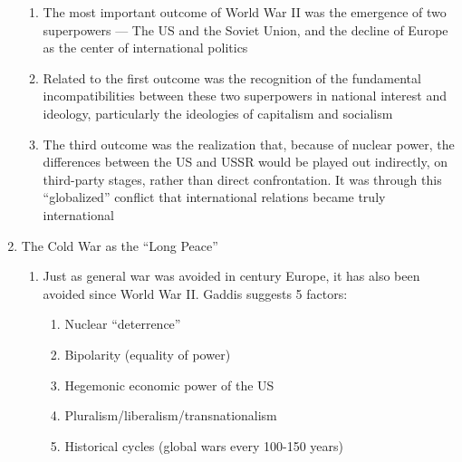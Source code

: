 \documentclass[12pt]{article}
\begin{document}
\begin{enumerate}
        \begin{enumerate}

          \item The most important outcome of World War II was the emergence of two superpowers — The US and the Soviet Union, and the decline of Europe as the center of international politics

          \item Related to the first outcome was the recognition of the fundamental incompatibilities between these two superpowers in national interest and ideology, particularly the ideologies of capitalism and socialism

          \item The third outcome was the realization that, because of nuclear power, the differences between the US and USSR would be played out indirectly, on third-party stages, rather than direct confrontation. It was through this “globalized” conflict that international relations became truly international

        \end{enumerate}

      \item The Cold War as the “Long Peace”

        \begin{enumerate}

          \item Just as general war was avoided in  century Europe, it has also been avoided since World War II. Gaddis suggests 5 factors:

            \begin{enumerate}

              \item Nuclear “deterrence”

              \item Bipolarity (equality of power)

              \item Hegemonic economic power of the US

              \item Pluralism/liberalism/transnationalism

              \item Historical cycles (global wars every 100-150 years)

            \end{enumerate}

        \end{enumerate}


\end{enumerate}
\end{document}
